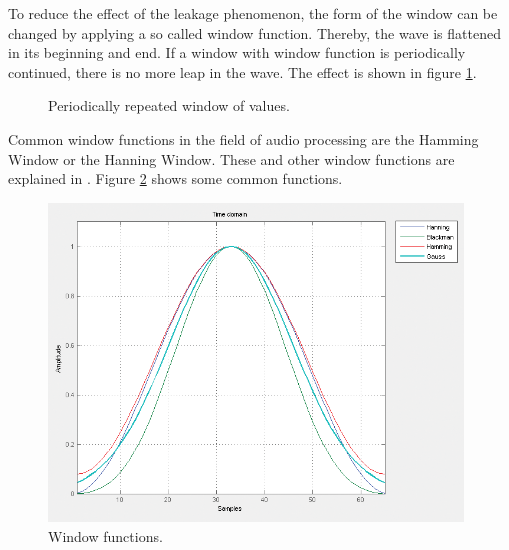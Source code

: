 To reduce the effect of the leakage phenomenon, the form of the window can be changed by applying a so called window function. Thereby, the wave is flattened in its beginning and end. If a window with window function is periodically continued, there is no more leap in the wave. The effect is shown in figure \ref{fig:window1}.

\begin{figure}[h]
	\centering
	\caption{ Periodically repeated window of values. }
	\label{fig:window1}
\end{figure}

Common window functions in the field of audio processing are the Hamming Window or the Hanning Window. These and other window functions are explained in \autocite[]{Harris:1978}. Figure \ref{fig:window2} shows some common functions.

\begin{figure}[h]
	\centering
	\includegraphics[width=11cm]{images/windowfunctions.png}
	\caption{Window functions.}
	\label{fig:window2}
\end{figure}


